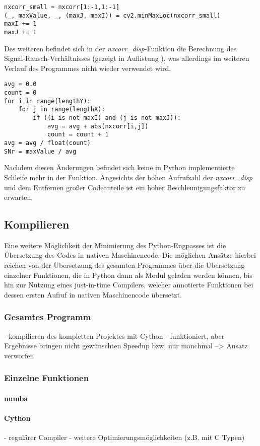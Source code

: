 \begin{lstlisting}
nxcorr_small = nxcorr[1:-1,1:-1]
(_, maxValue, _, (maxJ, maxI)) = cv2.minMaxLoc(nxcorr_small)
maxI += 1
maxJ += 1
\end{lstlisting}

Des weiteren befindet sich in der \textit{nxcorr\_disp}-Funktion die Berechnung des Signal-Rausch-Verhältnisses (gezeigt in Auflistung ), was allerdings im weiteren Verlauf des Programmes nicht wieder verwendet wird. 

\begin{lstlisting}
avg = 0.0
count = 0
for i in range(lengthY):
	for j in range(lengthX):
		if ((i is not maxI) and (j is not maxJ)):
			avg = avg + abs(nxcorr[i,j])
			count = count + 1
avg = avg / float(count)
SNr = maxValue / avg
\end{lstlisting}

Nachdem diesen Änderungen befindet sich keine in Python implementierte Schleife mehr in der Funktion. Angesichts der hohen Aufrufzahl der \textit{nxcorr\_disp} und dem Entfernen großer Codeanteile ist ein hoher Beschleunigungsfaktor zu erwarten. 

\subsection{Kompilieren}

Eine weitere Möglichkeit der Minimierung des Python-Engpasses ist die Übersetzung des Codes in nativen Maschinencode. Die möglichen Ansätze hierbei reichen von der Übersetzung des gesamten Programmes über die Übersetzung einzelner Funktionen, die in Python dann als Modul geladen werden können, bis hin zur Nutzung eines just-in-time Compilers, welcher annotierte Funktionen bei dessen ersten Aufruf in nativen Maschinencode übersetzt. 

\subsubsection{Gesamtes Programm}

\begin{correctmore}
	- kompilieren des kompletten Projektes mit Cython
	- funktioniert, aber Ergebnisse bringen nicht gewünschten Speedup bzw. nur manchmal
	--> Ansatz verworfen
\end{correctmore}

\subsubsection{Einzelne Funktionen}


\paragraph{numba}


\paragraph{Cython}

\begin{correctmore}
	- regulärer Compiler
	- weitere Optimierungsmöglichkeiten (z.B. mit C Typen)
\end{correctmore}